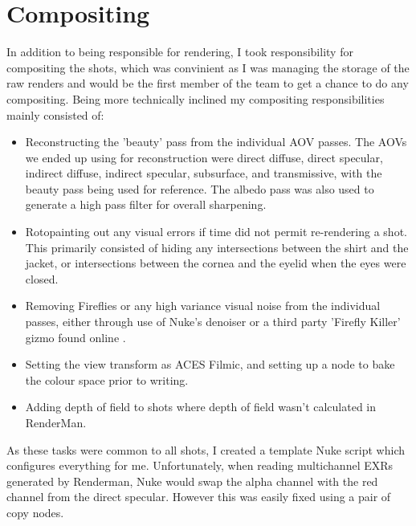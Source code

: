 \documentclass[11pt]{article}
\begin{document}
\cite{martin_2008}

\section{Compositing}

In addition to being responsible for rendering, I took responsibility for compositing the shots, which was convinient as I was managing the storage of the raw renders and would be the first member of the team to get a chance to do any compositing. Being more technically inclined my compositing responsibilities mainly consisted of:

\begin{itemize}

\item Reconstructing the 'beauty' pass from the individual AOV passes. The AOVs we ended up using for reconstruction were direct diffuse, direct specular, indirect diffuse, indirect specular, subsurface, and transmissive, with the beauty pass being used for reference. The albedo pass was also used to generate a high pass filter for overall sharpening.

\item Rotopainting out any visual errors if time did not permit re-rendering a shot. This primarily consisted of hiding any intersections between the shirt and the jacket, or intersections between the cornea and the eyelid when the eyes were closed.

\item Removing Fireflies or any high variance visual noise from the individual passes, either through use of Nuke's denoiser or a third party 'Firefly Killer' gizmo found online \cite{muller_2015}.

\item Setting the view transform as ACES Filmic, and setting up a node to bake the colour space prior to writing.

\item Adding depth of field to shots where depth of field wasn't calculated in RenderMan.

\end{itemize}

As these tasks were common to all shots, I created a template Nuke script which configures everything for me. Unfortunately, when reading multichannel EXRs generated by Renderman, Nuke would swap the alpha channel with the red channel from the direct specular. However this was easily fixed using a pair of copy nodes.
\end{document}
